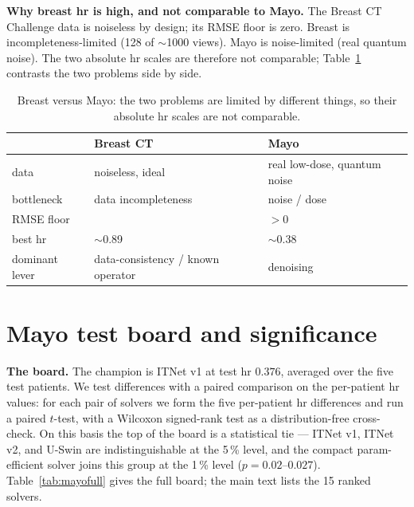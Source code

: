 \documentclass[AMA,twocolumn]{USG}
\begin{document}
\textbf{Why breast hr is high, and not comparable to Mayo.} The Breast CT Challenge data is noiseless by design; its RMSE floor is zero. Breast is incompleteness-limited (128 of $\sim$1000 views). Mayo is noise-limited (real quantum noise). The two absolute hr scales are therefore not comparable; Table~\ref{tab:s3contrast} contrasts the two problems side by side.

\begin{table}[tbp]
\caption{Breast versus Mayo: the two problems are limited by different things, so their absolute hr scales are not comparable.\label{tab:s3contrast}}
\centering
\setlength{\tabcolsep}{4pt}
\begin{tabular}{@{}l >{\raggedright\arraybackslash}p{} >{\raggedright\arraybackslash}p{}@{}}
\toprule
 & \textbf{Breast CT} & \textbf{Mayo} \\
\midrule
data           & noiseless, ideal        & real low-dose, quantum noise \\
bottleneck     & data incompleteness     & noise / dose \\
RMSE floor     & 0                       & $>0$ \\
best hr        & $\sim$0.89              & $\sim$0.38 \\
dominant lever & data-consistency / known operator & denoising \\
\bottomrule
\end{tabular}
\end{table}

\section{Mayo test board and significance}\label{sec:s4}

\textbf{The board.} The champion is ITNet v1 at test hr $0.376$, averaged over the five test patients. We test differences with a paired comparison on the per-patient hr values: for each pair of solvers we form the five per-patient hr differences and run a paired $t$-test, with a Wilcoxon signed-rank test as a distribution-free cross-check. On this basis the top of the board is a statistical tie --- ITNet v1, ITNet v2, and U-Swin are indistinguishable at the 5\,\% level, and the compact param-efficient solver joins this group at the 1\,\% level ($p=0.02$--$0.027$). Table~\ref{tab:mayofull} gives the full board; the main text lists the 15 ranked solvers.
\end{document}
